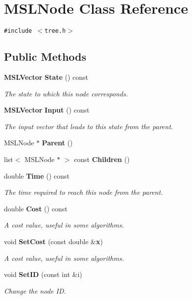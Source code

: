 \section{MSLNode  Class Reference}
\label{classMSLNode}
{\tt \#include $<$tree.h$>$}

\subsection*{Public Methods}
\begin{CompactItemize}
\item 
{\bf MSLVector} {\bf State} () const
\begin{CompactList}\small\item\em The state to which this node corresponds.\item\end{CompactList}\item 
{\bf MSLVector} {\bf Input} () const
\begin{CompactList}\small\item\em The input vector that leads to this state from the parent.\item\end{CompactList}\item 
MSLNode $\ast$ {\bf Parent} ()
\item 
list$<$ MSLNode $\ast$ $>$ const {\bf Children} ()
\item 
double {\bf Time} () const
\begin{CompactList}\small\item\em The time required to reach this node from the parent.\item\end{CompactList}\item 
double {\bf Cost} () const
\begin{CompactList}\small\item\em A cost value, useful in some algorithms.\item\end{CompactList}\item 
void {\bf Set\-Cost} (const double \&{\bf x})
\begin{CompactList}\small\item\em A cost value, useful in some algorithms.\item\end{CompactList}\item 
void {\bf Set\-ID} (const int \&i)
\begin{CompactList}\small\item\em Change the node ID.\item\end{CompactList}\item 

\end{CompactItemize}

